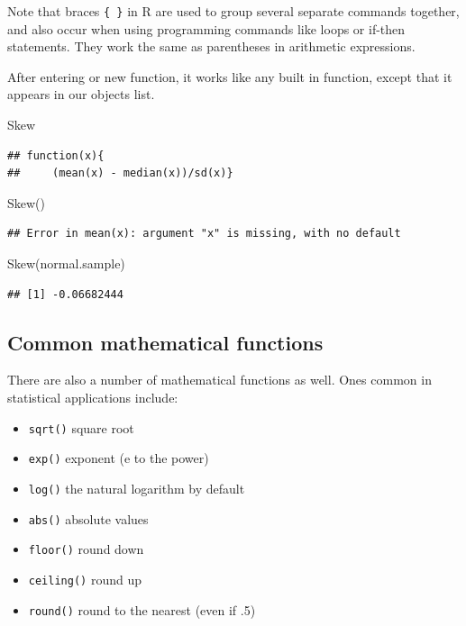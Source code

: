 \documentclass[
]{book}
\newenvironment{Shaded}{\begin{snugshade}}{\end{snugshade}}
\newcommand{\FunctionTok}[1]{\textcolor[rgb]{0.00,0.00,0.00}{#1}}
\newcommand{\NormalTok}[1]{#1}
\providecommand{\tightlist}{%
  \setlength{\itemsep}{0pt}\setlength{\parskip}{0pt}}
\begin{document}
Note that braces \texttt{\{\ \}} in R are used to group several separate commands together, and also occur when using programming commands like loops or if-then statements. They work the same as parentheses in arithmetic expressions.

After entering or new function, it works like any built in function, except that it appears in our objects list.

\begin{Shaded}
\begin{Highlighting}[]
\NormalTok{Skew}
\end{Highlighting}
\end{Shaded}

\begin{verbatim}
## function(x){
##     (mean(x) - median(x))/sd(x)}
\end{verbatim}

\begin{Shaded}
\begin{Highlighting}[]
\FunctionTok{Skew}\NormalTok{()}
\end{Highlighting}
\end{Shaded}

\begin{verbatim}
## Error in mean(x): argument "x" is missing, with no default
\end{verbatim}

\begin{Shaded}
\begin{Highlighting}[]
\FunctionTok{Skew}\NormalTok{(normal.sample)}
\end{Highlighting}
\end{Shaded}

\begin{verbatim}
## [1] -0.06682444
\end{verbatim}

\hypertarget{common-mathematical-functions}{%
\subsection*{Common mathematical functions}\label{common-mathematical-functions}}

There are also a number of mathematical functions as well. Ones common in statistical applications include:

\begin{itemize}
\tightlist
\item
  \texttt{sqrt()} square root
\item
  \texttt{exp()} exponent (e to the power)
\item
  \texttt{log()} the natural logarithm by default
\item
  \texttt{abs()} absolute values
\item
  \texttt{floor()} round down
\item
  \texttt{ceiling()} round up
\item
  \texttt{round()} round to the nearest (even if .5)
\end{itemize}
\end{document}
